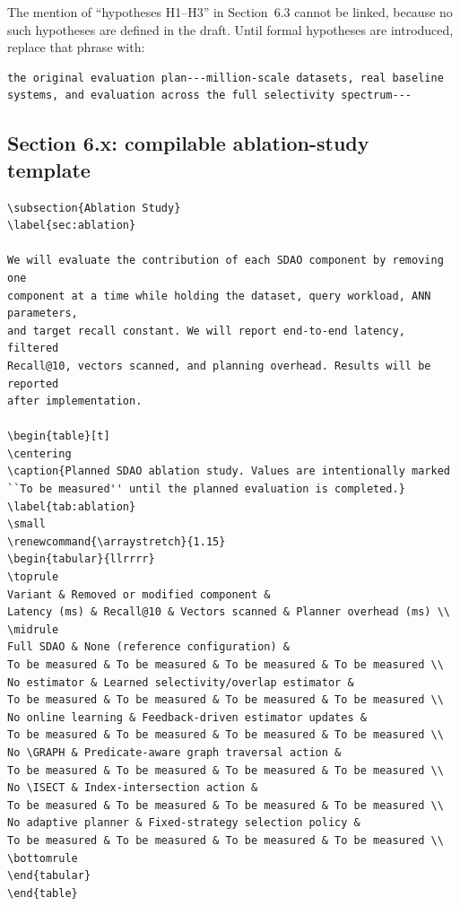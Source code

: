 \documentclass[11pt]{article}
\newcommand{\GRAPH}{\textsc{GRAPH}}
\newcommand{\ISECT}{\textsc{ISECT}}
\begin{document}
The mention of ``hypotheses H1--H3'' in Section~6.3 cannot be linked,
because no such hypotheses are defined in the draft. Until formal hypotheses
are introduced, replace that phrase with:

\begin{verbatim}
the original evaluation plan---million-scale datasets, real baseline
systems, and evaluation across the full selectivity spectrum---
\end{verbatim}

\subsection*{Section 6.x: compilable ablation-study template}
\label{sec:ablation-template}

\begin{verbatim}
\subsection{Ablation Study}
\label{sec:ablation}

We will evaluate the contribution of each SDAO component by removing one
component at a time while holding the dataset, query workload, ANN parameters,
and target recall constant. We will report end-to-end latency, filtered
Recall@10, vectors scanned, and planning overhead. Results will be reported
after implementation.

\begin{table}[t]
\centering
\caption{Planned SDAO ablation study. Values are intentionally marked
``To be measured'' until the planned evaluation is completed.}
\label{tab:ablation}
\small
\renewcommand{\arraystretch}{1.15}
\begin{tabular}{llrrrr}
\toprule
Variant & Removed or modified component &
Latency (ms) & Recall@10 & Vectors scanned & Planner overhead (ms) \\
\midrule
Full SDAO & None (reference configuration) &
To be measured & To be measured & To be measured & To be measured \\
No estimator & Learned selectivity/overlap estimator &
To be measured & To be measured & To be measured & To be measured \\
No online learning & Feedback-driven estimator updates &
To be measured & To be measured & To be measured & To be measured \\
No \GRAPH & Predicate-aware graph traversal action &
To be measured & To be measured & To be measured & To be measured \\
No \ISECT & Index-intersection action &
To be measured & To be measured & To be measured & To be measured \\
No adaptive planner & Fixed-strategy selection policy &
To be measured & To be measured & To be measured & To be measured \\
\bottomrule
\end{tabular}
\end{table}
\end{verbatim}
\end{document}
